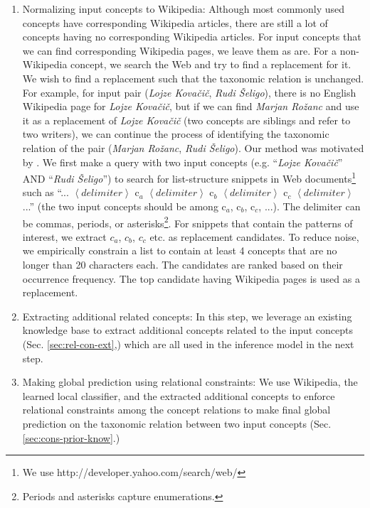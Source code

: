 \begin{enumerate}
\item Normalizing input concepts to Wikipedia: Although most commonly
  used concepts have corresponding Wikipedia articles, there are still
  a lot of concepts having no corresponding Wikipedia articles. For
  input concepts that we can find corresponding Wikipedia pages, we
  leave them as are. For a non-Wikipedia concept, we search the Web
  and try to find a replacement for it. We wish to find a replacement
  such that the taxonomic relation is unchanged. For example, for
  input pair ({\em Lojze Kova\v{c}i\v{c}}, {\em Rudi \v{S}eligo}),
  there is no English Wikipedia page for {\em Lojze Kova\v{c}i\v{c}},
  but if we can find {\em Marjan Ro\v{z}anc} and use it as a
  replacement of {\em Lojze Kova\v{c}i\v{c}} (two concepts are
  siblings and refer to two writers), we can continue the process of
  identifying the taxonomic relation of the pair ({\em Marjan
    Ro\v{z}anc}, {\em Rudi \v{S}eligo}). Our method was motivated by
  \cite{1321585}. We first make a query with two input concepts
  (e.g. ``{\em Lojze Kova\v{c}i\v{c}}'' AND ``{\em Rudi \v{S}eligo}'')
  to search for list-structure snippets in Web documents\footnote{We
    use http://developer.yahoo.com/search/web/} such as ``... $\left <
    delimiter \right >$ c$_a$ $\left < delimiter \right >$ c$_b$
  $\left < delimiter \right >$ c$_c$ $\left < delimiter \right >$
  ...'' (the two input concepts should be among c$_a$, c$_b$, c$_c$,
  ...). The delimiter can be commas, periods, or
  asterisks\footnote{Periods and asterisks capture enumerations.}. For
  snippets that contain the patterns of interest, we extract $c_a$,
  $c_b$, $c_c$ etc. as replacement candidates. To reduce noise, we
  empirically constrain a list to contain at least 4 concepts that are
  no longer than 20 characters each. The candidates are ranked based
  on their occurrence frequency. The top candidate having Wikipedia
  pages is used as a replacement.
\item Extracting additional related concepts: In this step, we
  leverage an existing knowledge base to extract additional concepts
  related to the input concepts (Sec. \ref{sec:rel-con-ext},) which
  are all used in the inference model in the next step.
\item Making global prediction using relational constraints: We use
  Wikipedia, the learned local classifier, and the extracted
  additional concepts to enforce relational constraints among the
  concept relations to make final global prediction on the taxonomic
  relation between two input concepts
  (Sec. \ref{sec:cons-prior-know}.)
\end{enumerate}


